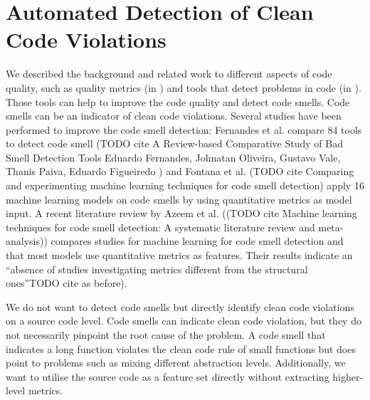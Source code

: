 \section{Automated Detection of Clean Code Violations}
We described the background and related work to different aspects of code quality, such as quality metrics (in ) and tools that detect problems in code (in ). Those tools can help to improve the code quality and detect code smells. Code smells can be an indicator of clean code violations. Several studies have been performed to improve the code smell detection: Fernandes et al. compare 84 tools to detect code smell (TODO cite A Review-based Comparative Study of Bad Smell Detection Tools Eduardo Fernandes, Johnatan Oliveira, Gustavo Vale, Thanis Paiva, Eduardo Figueiredo ) and Fontana et al. (TODO cite Comparing and experimenting machine learning techniques for code smell detection) apply 16 machine learning models on code smells by using quantitative metrics as model input. A recent literature review by Azeem et al. ((TODO cite Machine learning techniques for code smell detection: A systematic literature review and meta-analysis)) compares studies for machine learning for code smell detection and that most models use quantitative metrics as features. Their results indicate an \enquote{absence of studies investigating metrics different from the structural
ones}TODO cite as before).

We do not want to detect code smells but directly identify clean code violations on a source code level. Code smells can indicate clean code violation, but they do not necessarily pinpoint the root cause of the problem. A code smell that indicates a long function violates the clean code rule of small functions but does point to problems such as mixing different abstraction levels. Additionally, we want to utilise the source code as a feature set directly without extracting higher-level metrics.
